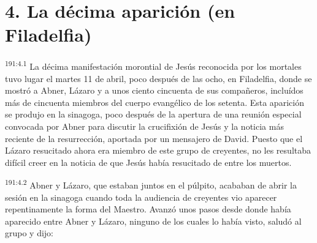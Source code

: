 \section*{4. La décima aparición (en Filadelfia)}
\par 
\textsuperscript{191:4.1} La décima manifestación morontial de Jesús reconocida por los mortales tuvo lugar el martes 11 de abril, poco después de las ocho, en Filadelfia, donde se mostró a Abner, Lázaro y a unos ciento cincuenta de sus compañeros, incluídos más de cincuenta miembros del cuerpo evangélico de los setenta. Esta aparición se produjo en la sinagoga, poco después de la apertura de una reunión especial convocada por Abner para discutir la crucifixión de Jesús y la noticia más reciente de la resurrección, aportada por un mensajero de David. Puesto que el Lázaro resucitado ahora era miembro de este grupo de creyentes, no les resultaba difícil creer en la noticia de que Jesús había resucitado de entre los muertos.

\par 
\textsuperscript{191:4.2} Abner y Lázaro, que estaban juntos en el púlpito, acababan de abrir la sesión en la sinagoga cuando toda la audiencia de creyentes vio aparecer repentinamente la forma del Maestro. Avanzó unos pasos desde donde había aparecido entre Abner y Lázaro, ninguno de los cuales lo había visto, saludó al grupo y dijo:

